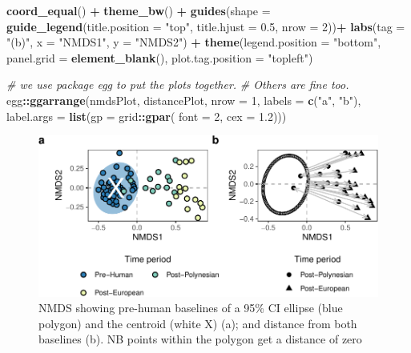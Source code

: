 \documentclass[nofonts,]{tufte-handout}
\newenvironment{Shaded}{\begin{snugshade}}{\end{snugshade}}
\newcommand{\AttributeTok}[1]{\textcolor[rgb]{0.13,0.29,0.53}{#1}}
\newcommand{\CommentTok}[1]{\textcolor[rgb]{0.56,0.35,0.01}{\textit{#1}}}
\newcommand{\DecValTok}[1]{\textcolor[rgb]{0.00,0.00,0.81}{#1}}
\newcommand{\FloatTok}[1]{\textcolor[rgb]{0.00,0.00,0.81}{#1}}
\newcommand{\FunctionTok}[1]{\textcolor[rgb]{0.13,0.29,0.53}{\textbf{#1}}}
\newcommand{\NormalTok}[1]{#1}
\newcommand{\SpecialCharTok}[1]{\textcolor[rgb]{0.81,0.36,0.00}{\textbf{#1}}}
\newcommand{\StringTok}[1]{\textcolor[rgb]{0.31,0.60,0.02}{#1}}
\begin{document}
\begin{Shaded}
\begin{Highlighting}[]
  \FunctionTok{coord\_equal}\NormalTok{() }\SpecialCharTok{+}
  \FunctionTok{theme\_bw}\NormalTok{() }\SpecialCharTok{+}
  \FunctionTok{guides}\NormalTok{(}\AttributeTok{shape =} \FunctionTok{guide\_legend}\NormalTok{(}\AttributeTok{title.position =} \StringTok{"top"}\NormalTok{,}
                              \AttributeTok{title.hjust =} \FloatTok{0.5}\NormalTok{,}
                              \AttributeTok{nrow =} \DecValTok{2}\NormalTok{))}\SpecialCharTok{+}
  \FunctionTok{labs}\NormalTok{(}\AttributeTok{tag =} \StringTok{"(b)"}\NormalTok{, }\AttributeTok{x =} \StringTok{"NMDS1"}\NormalTok{, }\AttributeTok{y =} \StringTok{"NMDS2"}\NormalTok{) }\SpecialCharTok{+}
  \FunctionTok{theme}\NormalTok{(}\AttributeTok{legend.position =} \StringTok{"bottom"}\NormalTok{, }
        \AttributeTok{panel.grid =} \FunctionTok{element\_blank}\NormalTok{(),}
        \AttributeTok{plot.tag.position =} \StringTok{"topleft"}\NormalTok{)}


\CommentTok{\# we use package egg to put the plots together. }
\CommentTok{\# Others are fine too.}
\NormalTok{egg}\SpecialCharTok{::}\FunctionTok{ggarrange}\NormalTok{(nmdsPlot, distancePlot, }\AttributeTok{nrow =} \DecValTok{1}\NormalTok{,}
               \AttributeTok{labels =} \FunctionTok{c}\NormalTok{(}\StringTok{"a"}\NormalTok{, }\StringTok{"b"}\NormalTok{),}
               \AttributeTok{label.args =} \FunctionTok{list}\NormalTok{(}\AttributeTok{gp =}\NormalTok{ grid}\SpecialCharTok{::}\FunctionTok{gpar}\NormalTok{(}
                 \AttributeTok{font =} \DecValTok{2}\NormalTok{,}
                 \AttributeTok{cex =} \FloatTok{1.2}\NormalTok{)))}
\end{Highlighting}
\end{Shaded}

\begin{figure}
\includegraphics{Technical-supplement_files/figure-latex/unnamed-chunk-3-1} \caption[NMDS showing pre-human baselines of a 95\% CI ellipse (blue polygon) and the centroid (white X) (a)]{NMDS showing pre-human baselines of a 95\% CI ellipse (blue polygon) and the centroid (white X) (a); and distance from both baselines (b). NB points within the polygon get a distance of zero}\label{fig:unnamed-chunk-3}
\end{figure}
\end{document}
